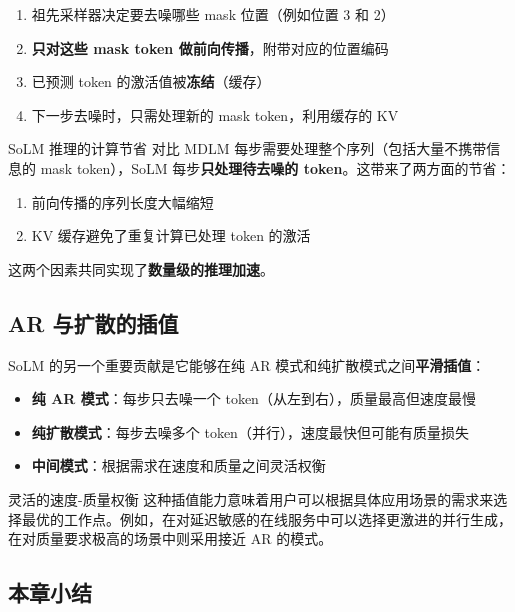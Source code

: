 \documentclass[a4paper]{article}
\begin{document}
\begin{enumerate}
    \item 祖先采样器决定要去噪哪些 mask 位置（例如位置 3 和 2）
    \item \textbf{只对这些 mask token 做前向传播}，附带对应的位置编码
    \item 已预测 token 的激活值被\textbf{冻结}（缓存）
    \item 下一步去噪时，只需处理新的 mask token，利用缓存的 KV
\end{enumerate}

\begin{importantbox}{SoLM 推理的计算节省}
对比 MDLM 每步需要处理整个序列（包括大量不携带信息的 mask token），SoLM 每步\textbf{只处理待去噪的 token}。这带来了两方面的节省：
\begin{enumerate}
    \item 前向传播的序列长度大幅缩短
    \item KV 缓存避免了重复计算已处理 token 的激活
\end{enumerate}
这两个因素共同实现了\textbf{数量级的推理加速}。
\end{importantbox}

\subsection{AR 与扩散的插值}

SoLM 的另一个重要贡献是它能够在纯 AR 模式和纯扩散模式之间\textbf{平滑插值}：

\begin{itemize}
    \item \textbf{纯 AR 模式}：每步只去噪一个 token（从左到右），质量最高但速度最慢
    \item \textbf{纯扩散模式}：每步去噪多个 token（并行），速度最快但可能有质量损失
    \item \textbf{中间模式}：根据需求在速度和质量之间灵活权衡
\end{itemize}

\begin{knowledgebox}{灵活的速度-质量权衡}
这种插值能力意味着用户可以根据具体应用场景的需求来选择最优的工作点。例如，在对延迟敏感的在线服务中可以选择更激进的并行生成，在对质量要求极高的场景中则采用接近 AR 的模式。
\end{knowledgebox}

\subsection{本章小结}
\end{document}
